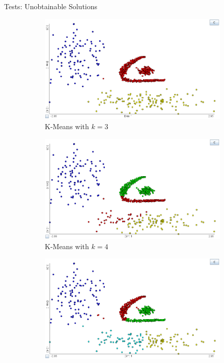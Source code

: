 \documentclass[aspectratio=169]{beamer}
\begin{document}
\begin{frame}{Tests: Unobtainable Solutions}
	\begin{figure}[h]
	\centering
	\begin{subfigure}[t]{.32\textwidth}
		  \centering
		  \includegraphics[width=.99\linewidth]{unob_k3}
		  \caption{K-Means with $k=3$}
		  \label{fig:unob_k3}
	\end{subfigure}
	\begin{subfigure}[t]{.32\textwidth}
		  \centering
		  \includegraphics[width=.99\linewidth]{unob_k4ex}
		  \caption{K-Means with $k=4$}
		  \label{fig:unob_k4ex}
	\end{subfigure}
	\begin{subfigure}[t]{.32\textwidth}
		  \centering
		  \includegraphics[width=.99\linewidth]{unob_k5ex}

\end{subfigure}
\end{figure}
\end{frame}
\end{document}
